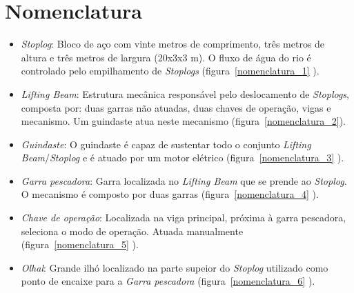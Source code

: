 

\section{Nomenclatura}
\begin{itemize}

\item \emph{Stoplog}: Bloco de aço com vinte metros de comprimento, três metros
de altura e três metros de largura (20x3x3 m). O fluxo de água do rio é
controlado pelo empilhamento de \emph{Stoplogs} (figura~\ref{nomenclatura_1} ).


\item \emph{Lifting Beam}: Estrutura mecânica responsável pelo deslocamento de
\emph{Stoplogs}, composta por: duas garras não atuadas, duas chaves de operação, vigas e mecanismo. Um guindaste atua neste mecanismo (figura~\ref{nomenclatura_2}).
    
\item \emph{Guindaste}: O guindaste é capaz de sustentar todo o conjunto
\emph{Lifting Beam}/\emph{Stoplog} e é atuado por um motor elétrico
(figura~\ref{nomenclatura_3} ).

\item \emph{Garra pescadora}: Garra localizada no \emph{Lifting Beam} que se
prende ao \emph{Stoplog}. O mecanismo é composto por duas garras (figura~\ref{nomenclatura_4} ).

\item \emph{Chave de operação}: Localizada na viga principal, próxima à garra
pescadora, seleciona o modo de operação.  Atuada manualmente (figura~\ref{nomenclatura_5} ).

\item \emph{Olhal}: Grande ilhó localizado na parte supeior do \emph{Stoplog}
utilizado como ponto de encaixe para a \emph{Garra pescadora}
(figura~\ref{nomenclatura_6} ).

\end{itemize}

